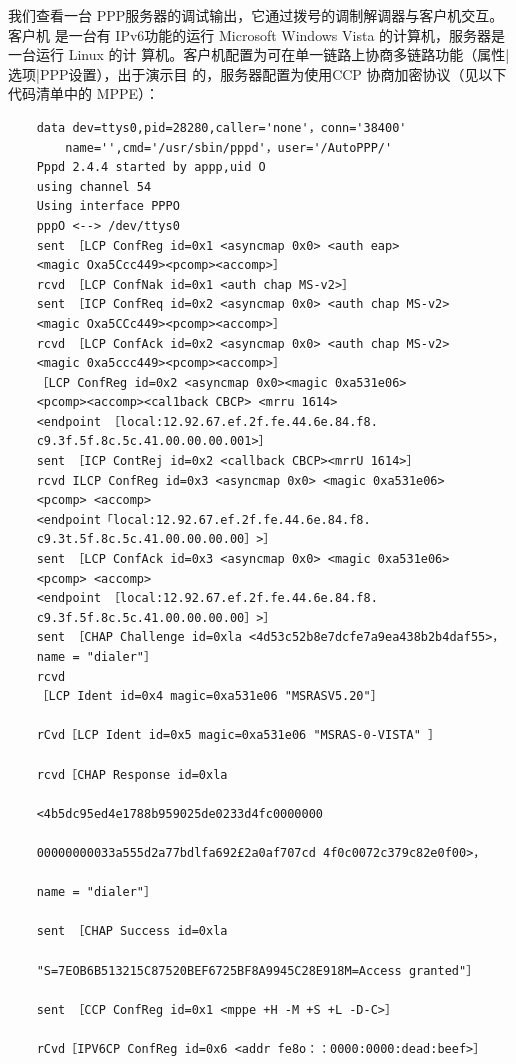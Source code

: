 我们查看一台 PPP服务器的调试输出，它通过拨号的调制解调器与客户机交互。客户机
是一台有 IPv6功能的运行 Microsoft Windows Vista 的计算机，服务器是一台运行 Linux 的计
算机。客户机配置为可在单一链路上协商多链路功能（属性|选项|PPP设置），出于演示目
的，服务器配置为使用CCP 协商加密协议（见以下代码清单中的 MPPE）：

\begin{verbatim}
    data dev=ttys0,pid=28280,caller='none'，conn='38400'
        name='',cmd='/usr/sbin/pppd'，user='/AutoPPP/'
    Pppd 2.4.4 started by appp,uid O
    using channel 54
    Using interface PPPO
    pppO <--> /dev/ttys0
    sent ［LCP ConfReg id=0x1 <asyncmap 0x0> <auth eap>
    <magic Oxa5Ccc449><pcomp><accomp>］
    rcvd ［LCP ConfNak id=0x1 <auth chap MS-v2>］
    sent ［ICP ConfReq id=0x2 <asyncmap 0x0> <auth chap MS-v2>
    <magic Oxa5CCc449><pcomp><accomp>］
    rcvd ［LCP ConfAck id=0x2 <asyncmap 0x0> <auth chap MS-v2>
    <magic 0xa5ccc449><pcomp><accomp>］
    ［LCP ConfReg id=0x2 <asyncmap 0x0><magic 0xa531e06>
    <pcomp><accomp><cal1back CBCP> <mrru 1614>
    <endpoint ［local:12.92.67.ef.2f.fe.44.6e.84.f8.
    c9.3f.5f.8c.5c.41.00.00.00.001>］
    sent ［ICP ContRej id=0x2 <callback CBCP><mrrU 1614>］
    rcvd ILCP ConfReg id=0x3 <asyncmap 0x0> <magic 0xa531e06>
    <pcomp> <accomp>
    <endpoint「local:12.92.67.ef.2f.fe.44.6e.84.f8.
    c9.3t.5f.8c.5c.41.00.00.00.00］>］
    sent ［LCP ConfAck id=0x3 <asyncmap 0x0> <magic 0xa531e06>
    <pcomp> <accomp>
    <endpoint ［local:12.92.67.ef.2f.fe.44.6e.84.f8.
    c9.3f.5f.8c.5c.41.00.00.00.00］>］
    sent ［CHAP Challenge id=0xla <4d53c52b8e7dcfe7a9ea438b2b4daf55>，
    name = "dialer"］
    rcvd
    ［LCP Ident id=0x4 magic=0xa531e06 "MSRASV5.20"］
    
    rCvd［LCP Ident id=0x5 magic=0xa531e06 "MSRAS-0-VISTA" ］
    
    rcvd［CHAP Response id=0xla
    
    <4b5dc95ed4e1788b959025de0233d4fc0000000
    
    00000000033a555d2a77bdlfa692£2a0af707cd 4f0c0072c379c82e0f00>，
    
    name = "dialer"］
    
    sent ［CHAP Success id=0xla
    
    "S=7EOB6B513215C87520BEF6725BF8A9945C28E918M=Access granted"］
    
    sent ［CCP ConfReg id=0x1 <mppe +H -M +S +L -D-C>］
    
    rCvd［IPV6CP ConfReg id=0x6 <addr fe8o：：0000:0000:dead:beef>］
    

\end{verbatim}
